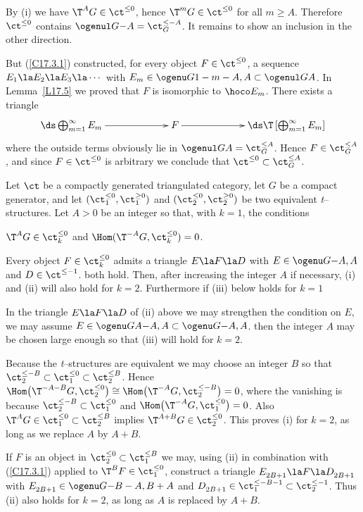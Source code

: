 \documentclass[11pt]{amsart}
\begin{document}
\prf
By (i) we have $\T^AG\in\ct^{\leq0}$, hence $\T^mG\in\ct^{\leq0}$ for all
$m\geq A$. Therefore $\ct^{\leq0}$ contains $\ogenul G{}{-A}=\ct_G^{\leq-A}$.
It remains to show an inclusion in the other direction.

But (\ref{C17.3.1}) constructed, for every object $F\in\ct^{\leq0}$, a sequence
$E_1\la E_2\la E_3\la\cdots$ with
$E_m\in\ogenu G{}{1-m-A,A}\subset\ogenul G{}A$.
In Lemma~\ref{L17.5} we proved that $F$ is isomorphic
to $\hoco E_m$. There exists a triangle
\[\xymatrix@C+40pt{
  \ds\bigoplus_{m=1}^\infty E_m \ar[r] &
  F \ar[r] &
\ds\T\left[\bigoplus_{m=1}^\infty E_m\right] 
}\]
where the outside terms obviously lie in $\ogenul G{}A=\ct_G^{\leq A}$. Hence
$F\in\ct_G^{\leq A}$, and since $F\in\ct^{\leq0}$ is arbitrary
we conclude that $\ct^{\leq0}\subset\ct_G^{\leq A}$.
\eprf


Let $\ct$ be a compactly generated triangulated category, let
$G$ be a compact generator, and let $(\ct_1^{\leq0},\ct_1^{\geq0})$
and $(\ct_2^{\leq0},\ct_2^{\geq0})$ be two equivalent {\it t}--structures.
Let $A>0$ be an integer so that, with $k=1$, the conditions
\be
\item
$\T^AG\in\ct_k^{\leq0}$ and $\Hom(\T^{-A}G,\ct_k^{\leq0})=0$.
\item
Every object $F\in\ct_k^{\leq 0}$ admits a triangle
$E\la F\la D$ with $E\in\ogenu G{}{-A,A}$ and
$D\in\ct^{\leq-1}$.
\setcounter{enumiv}{\value{enumi}}
\ee
both hold. Then, after increasing the integer $A$ if
necessary, 
(i) and (ii) will also hold for $k=2$.
Furthermore if (iii) below holds for $k=1$
\be
\setcounter{enumi}{\value{enumiv}}
\item
In the triangle 
$E\la F\la D$ of (ii) above we may  
strengthen the condition on $E$, we may assume
$E\in\ogenu GA{-A,A}\subset\ogenu G{}{-A,A}$.
\setcounter{enumiv}{\value{enumi}}
\ee
then the integer $A$ may be chosen large enough so that
(iii) will hold for $k=2$.
\elem

\prf
Because the {\it t}--structures are equivalent we may choose an
integer $B$ so that $\ct_2^{\leq-B}\subset\ct_1^{\leq0}\subset\ct_2^{\leq B}$.
Hence
$\Hom\big(\T^{-A-B}G,\ct_2^{\leq0}\big)\cong\Hom\big(\T^{-A}G,\ct_2^{\leq-B}\big)=0$,
where the vanishing is because $\ct_2^{\leq-B}\subset\ct_1^{\leq0}$ and
$\Hom\big(\T^{-A}G,\ct_1^{\leq0}\big)=0$. Also
$\T^AG\in\ct_1^{\leq0}\subset\ct_2^{\leq B}$ implies
$\T^{A+B}G\in\ct_2^{\leq 0}$.
This proves (i) for $k=2$, as long as we replace $A$ by $A+B$.


If  $F$ is an object in $\ct_2^{\leq0}\subset\ct_1^{\leq B}$ we may,
using (ii) in combination with
(\ref{C17.3.1}) applied to $\T^BF\in\ct_1^{\leq 0}$, construct a triangle
$E_{2B+1}^{}\la F\la D_{2B+1}^{}$ with
$E_{2B+1}^{}\in\ogenu G{}{-B-A,B+A}$ and
$D_{2B+1}^{}\in\ct_1^{\leq-B-1}\subset\ct_2^{\leq-1}$.
Thus (ii) also holds for $k=2$, as long as $A$
is replaced by $A+B$.
\end{document}
